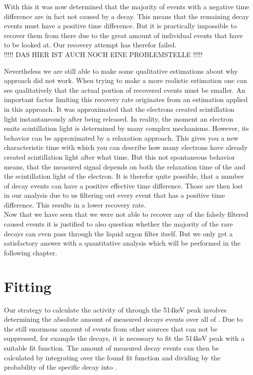 \documentclass[encoding=utf8,british]{tumphthesis}
\begin{document}
With this it was now determined that the majority of events with a negative time difference are in fact not caused by a \Kr decay.
This means that the remaining \Kr decay events must have a positive time difference.
But it is practically impossible to recover them from there due to the great amount of individual events that have to be looked at.
Our recovery attempt has therefor failed.
\\

!!!!! DAS HIER IST AUCH NOCH EINE PROBLEMSTELLE !!!!!

Nevertheless we are still able to make some qualitative estimations about why approach did not work. 
When trying to make a more realistic estimation one can see qualitatively that the actual portion of recovered events must be smaller.
An important factor limiting this recovery rate originates from an estimation applied in this approach.
It was approximated that the electrons created scintillation light instantaneously after being released.
In reality, the moment an electron emits scintillation light is determined by many complex mechanisms. 
However, its behavior can be approximated by a relaxation approach. 
This gives you a new characteristic time with which you can describe how many electrons have already created scintillation light after what time. 
But this not spontaneous behavior means, that the measured signal depends on both the relaxation time of the  and the scintillation light of the electron.
It is therefor quite possible, that a number of \Kr decay events can have a positive effective time difference.
Those are then lost in our analysis due to us filtering out every event that has a positive time difference.
This results in a lower recovery rate.
\\

Now that we have seen that we were not able to recover any of the falsely filtered \Kr caused events it is justified to also question whether the majority of the rare \Kr decays can even pass through the liquid argon filter itself.
But we only get a satisfactory answer with a quantitative analysis which will be performed in the following chapter.
\\

\section{Fitting}
\label{sec:Fitting}

Our strategy to calculate the activity of \Kr through the 514keV peak involves determining the absolute amount of measured \Kr decays events over all of \PII.
Due to the still enormous amount of events from other sources that can not be suppressed, for example the  decays, it is necessary to fit the 514keV peak with a suitable fit function.
The amount of measured \Kr decay events can then be calculated by integrating over the found fit function and dividing by the probability of the specific decay into .
\\
\end{document}
